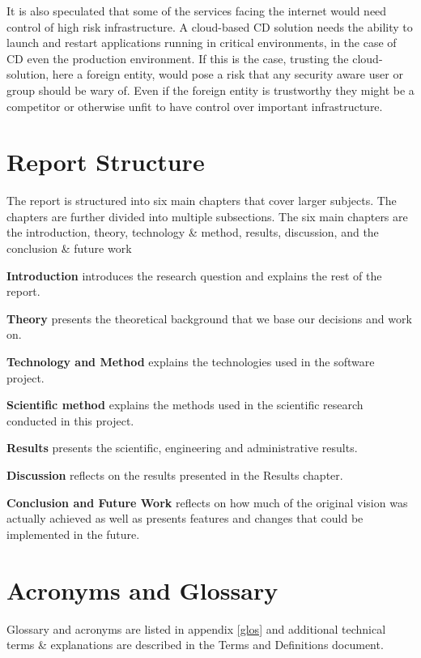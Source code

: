 It is also speculated that some of the services facing the internet would need control of high risk infrastructure. A cloud-based \acrshort{CD} solution needs the ability to launch and restart applications running in critical environments, in the case of \acrshort{CD} even the production environment. If this is the case, trusting the cloud-solution, here a foreign entity, would pose a risk that any security aware user or group should be wary of. Even if the foreign entity is trustworthy they might be a competitor or otherwise unfit to have control over important infrastructure.

\section{Report Structure}
The report is structured into six main chapters that cover larger subjects. The chapters are further divided into multiple subsections. The six main chapters are the introduction, theory, technology \& method, results, discussion, and the conclusion \& future work

\textbf{Introduction} introduces the research question and explains the rest of the report.

\textbf{Theory} presents the theoretical background that we base our decisions and work on. 

\textbf{Technology and Method} explains the technologies used in the software project. 

\textbf{Scientific method} explains the methods used in the scientific research conducted in this project. 

\textbf{Results} presents the scientific, engineering and administrative results.

\textbf{Discussion} reflects on the results presented in the Results chapter. 

\textbf{Conclusion and Future Work} reflects on how much of the  original vision was actually achieved as well as presents features and changes that could be implemented in the future.

\section{Acronyms and Glossary}
Glossary and acronyms are listed in appendix \ref{glos} and additional technical terms \& explanations are described in the Terms and Definitions document.
